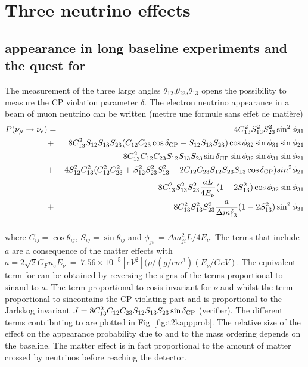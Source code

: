 \section{Three neutrino effects}
\subsection{\nue appearance in long baseline experiments and the quest for \dcp}

The measurement of the three large angles $\theta_{12}$,$\theta_{23}$,$\theta_{13}$ opens the possibility to measure the CP violation parameter $\delta$.
The electron neutrino appearance in a beam of muon neutrino can be written 
(mettre une formule sans effet de matière)
\begin{eqnarray*}
P(\nu_{\mu} \rightarrow \nu_e) & = & 4C^2_{13}S^2_{13}S^2_{23}\sin^2\phi_{31} \\
& + & 8 C^2_{13}S_{12}S_{13}S_{23}(C_{12}C_{23} \cos \delta_{\mathrm{CP}} - S_{12}S_{13}S_{23}) \cos\phi_{32}\sin\phi_{31}\sin\phi_{21} \\
& - & 8C^2_{13}C_{12}C_{23}S_{12}S_{13}S_{23} \sin \delta_{\mathrm{CP}} \sin \phi_{32} \sin \phi_{31} \sin \phi_{21} \\
& + & 4S^2_{12}C^2_{13} (C^2_{12}C^2_{23} + S^2_{12}S^2_{23}S^2_{13} - 2C_{12}C_{23}S_{12}S_{23}S_{13} \cos \delta_{\mathrm{CP}} ) sin^2\phi_{21}\\
& - & 8C^2_{13} S^2_{13} S^2_{23} \frac{aL}{4E_{\nu}} (1 - 2S^2_{13} ) \cos\phi_{32} \sin \phi_{31} \\
& + & 8C^2_{13}S^2_{13}S^2_{23}\frac{a}{\Delta m^2_{13}}(1-2S^2_{13})\sin^2\phi_{31} \\
\end{eqnarray*}
\begin{equation}
\label{eq:theta13app}
\end{equation}

where $C_{ij} = \cos \theta_{ij}$, $S_{ij} = \sin \theta_{ij}$ and $\phi_{ji}~= \Delta m^2_{ji} L / 4 E_{\nu}$. The terms that include $a$ are a consequence of the matter effects with $a=2\sqrt 2 G_F n_e E_{\nu}~=~7.56\times10^{-5} [eV^2](\rho/(g/cm^3)(E_{\nu}/GeV)$. 
The equivalent term for \pappb can be obtained by reversing the signs of the terms proportional to sin\dcp and to $a$. The term proportional to cos\dcp is invariant for $\nu$ and \nub whilst the term proportional to sin\dcp contains the CP violating part and is proportional to the Jarlskog invariant $J=8C^2_{13}C_{12}C_{23}S_{12}S_{13}S_{23} \sin \delta_{\mathrm{CP}} $ (verifier). 
The different terms contributing to \papp are plotted in Fig~\ref{fig:t2kappprob}.
The relative size of the effect on the appearance probability due to \dcp and to the mass ordering depends on the baseline. The matter effect is in fact proportional to the amount of matter crossed by neutrinos before reaching the detector.
 
